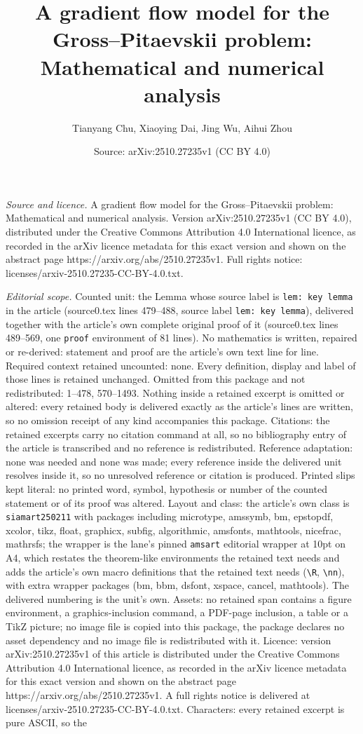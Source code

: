 \documentclass[10pt,a4paper]{amsart}
\title[A gradient flow model for the Gross--Pitaevskii problem: Mat]{A gradient flow model for the Gross--Pitaevskii problem: Mathematical and numerical analysis}
\author{Tianyang Chu, Xiaoying Dai, Jing Wu, Aihui Zhou}
\date{Source: arXiv:2510.27235v1 (CC BY 4.0)}
\begin{document}
\maketitle

\noindent\emph{Source and licence.} A gradient flow model for the Gross--Pitaevskii problem: Mathematical and numerical analysis. Version arXiv:2510.27235v1 (CC BY 4.0), distributed under the Creative Commons Attribution 4.0 International licence, as recorded in the arXiv licence metadata for this exact version and shown on the abstract page https://arxiv.org/abs/2510.27235v1. Full rights notice: licenses/arxiv-2510.27235-CC-BY-4.0.txt.\par\smallskip

\noindent\textit{Editorial scope.} Counted unit: the Lemma whose source label is \texttt{lem: key lemma} in the article (source0.tex lines 479--488, source label \texttt{lem: key lemma}), delivered together with the article's own complete original proof of it (source0.tex lines 489--569, one \texttt{proof} environment of 81 lines). No mathematics is written, repaired or re-derived: statement and proof are the article's own text line for line. Required context retained uncounted: none. Every definition, display and label of those lines is retained unchanged. Omitted from this package and not redistributed: 1--478, 570--1493. Nothing inside a retained excerpt is omitted or altered: every retained body is delivered exactly as the article's lines are written, so no omission receipt of any kind accompanies this package. Citations: the retained excerpts carry no citation command at all, so no bibliography entry of the article is transcribed and no reference is redistributed. Reference adaptation: none was needed and none was made; every reference inside the delivered unit resolves inside it, so no unresolved reference or citation is produced. Printed slips kept literal: no printed word, symbol, hypothesis or number of the counted statement or of its proof was altered. Layout and class: the article's own class is \texttt{siamart250211} with packages including microtype, amssymb, bm, epstopdf, xcolor, tikz, float, graphicx, subfig, algorithmic, amsfonts, mathtools, nicefrac, mathrsfs; the wrapper is the lane's pinned \texttt{amsart} editorial wrapper at 10pt on A4, which restates the theorem-like environments the retained text needs and adds the article's own macro definitions that the retained text needs (\texttt{\textbackslash R}, \texttt{\textbackslash nn}), with extra wrapper packages (bm, bbm, dsfont, xspace, cancel, mathtools). The delivered numbering is the unit's own. Assets: no retained span contains a figure environment, a graphics-inclusion command, a PDF-page inclusion, a table or a TikZ picture; no image file is copied into this package, the package declares no asset dependency and no image file is redistributed with it. Licence: version arXiv:2510.27235v1 of this article is distributed under the Creative Commons Attribution 4.0 International licence, as recorded in the arXiv licence metadata for this exact version and shown on the abstract page https://arxiv.org/abs/2510.27235v1. A full rights notice is delivered at licenses/arxiv-2510.27235-CC-BY-4.0.txt. Characters: every retained excerpt is pure ASCII, so the 
\end{document}

